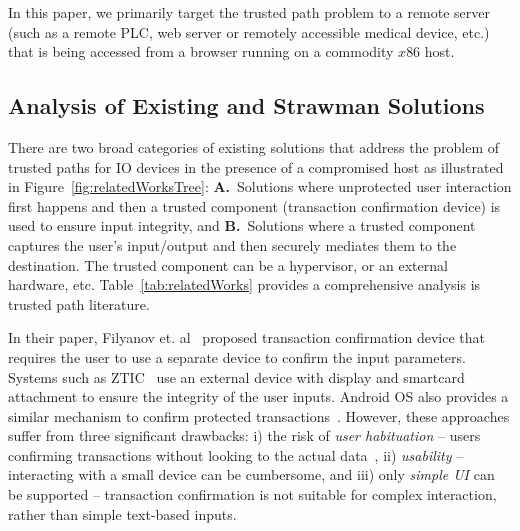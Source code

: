 In this paper, we primarily target the trusted path problem to a remote server (such as a remote PLC, web server or remotely accessible medical device, etc.) that is being accessed from a browser running on a commodity $x86$ host.


\subsection{Analysis of Existing and Strawman Solutions}
\label{sec:problemStatement:existingSolution}

There are two broad categories of existing solutions that address the problem of trusted paths for IO devices in the presence of a compromised host as illustrated in Figure~\ref{fig:relatedWorksTree}: \textbf{A.}~Solutions where unprotected user interaction first happens and then a trusted component (transaction confirmation device) is used to ensure input integrity,
and \textbf{B.}~Solutions where a trusted component captures the user's input/output and then securely mediates them to the destination. The trusted component can be a hypervisor, or an external hardware, etc. Table~\ref{tab:relatedWorks} provides a comprehensive analysis is trusted path literature.

 In their paper, Filyanov et. al~\cite{filyanov2011uni} proposed transaction confirmation device that requires the user to use a separate device to confirm the input parameters. Systems such as ZTIC~\cite{weigold2011secure} use an external device with display and smartcard attachment to ensure the integrity of the user inputs. Android OS also provides a similar mechanism to confirm protected transactions~\cite{android_confirm}. 
However, these approaches suffer from three significant drawbacks: i) the risk of \emph{user habituation} -- users confirming transactions without looking to the actual data~\cite{anderson2016warning},
ii) \emph{usability} -- interacting with a small device can be cumbersome, and iii) only \emph{simple UI} can be supported -- transaction confirmation is not suitable for complex interaction, rather than simple text-based inputs.


